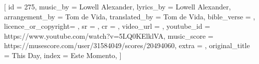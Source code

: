[
    id                  = {275},
    music_by            = {Lowell Alexander},
    lyrics_by           = {Lowell Alexander},
    arrangement_by      = {Tom de Vida}, %
    translated_by       = {Tom de Vida}, %
    bible_verse         = {},
    licence_or_copyright= {},
    sr                  = {},
    cr                  = {},
    video_url           = {}, %
    youtube_id          = {https://www.youtube.com/watch?v=5LQ0KElklVA}, %
    music_score         = {https://musescore.com/user/31584049/scores/20494060}, %
    extra               = {},
    original_title      = {This Day}, %
    index               = {Este Momento},
]

\beginverse

